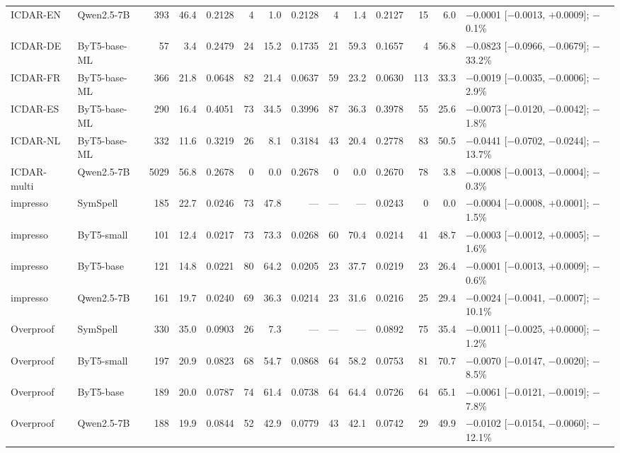 \begin{tabular}{llrrrrrrrrrrrl}
ICDAR-EN & Qwen2.5-7B & 393 & 46.4 & 0.2128 & 4 & 1.0 & 0.2128 & 4 & 1.4 & 0.2127 & 15 & 6.0 & $-$0.0001 [$-$0.0013, $+$0.0009]; $-$0.1\% \\
ICDAR-DE & ByT5-base-ML & 57 & 3.4 & 0.2479 & 24 & 15.2 & 0.1735 & 21 & 59.3 & 0.1657 & 4 & 56.8 & $-$0.0823 [$-$0.0966, $-$0.0679]; $-$33.2\% \\
ICDAR-FR & ByT5-base-ML & 366 & 21.8 & 0.0648 & 82 & 21.4 & 0.0637 & 59 & 23.2 & 0.0630 & 113 & 33.3 & $-$0.0019 [$-$0.0035, $-$0.0006]; $-$2.9\% \\
ICDAR-ES & ByT5-base-ML & 290 & 16.4 & 0.4051 & 73 & 34.5 & 0.3996 & 87 & 36.3 & 0.3978 & 55 & 25.6 & $-$0.0073 [$-$0.0120, $-$0.0042]; $-$1.8\% \\
ICDAR-NL & ByT5-base-ML & 332 & 11.6 & 0.3219 & 26 & 8.1 & 0.3184 & 43 & 20.4 & 0.2778 & 83 & 50.5 & $-$0.0441 [$-$0.0702, $-$0.0244]; $-$13.7\% \\
ICDAR-multi & Qwen2.5-7B & 5029 & 56.8 & 0.2678 & 0 & 0.0 & 0.2678 & 0 & 0.0 & 0.2670 & 78 & 3.8 & $-$0.0008 [$-$0.0013, $-$0.0004]; $-$0.3\% \\
impresso & SymSpell & 185 & 22.7 & 0.0246 & 73 & 47.8 & — & — & — & 0.0243 & 0 & 0.0 & $-$0.0004 [$-$0.0008, $+$0.0001]; $-$1.5\% \\
impresso & ByT5-small & 101 & 12.4 & 0.0217 & 73 & 73.3 & 0.0268 & 60 & 70.4 & 0.0214 & 41 & 48.7 & $-$0.0003 [$-$0.0012, $+$0.0005]; $-$1.6\% \\
impresso & ByT5-base & 121 & 14.8 & 0.0221 & 80 & 64.2 & 0.0205 & 23 & 37.7 & 0.0219 & 23 & 26.4 & $-$0.0001 [$-$0.0013, $+$0.0009]; $-$0.6\% \\
impresso & Qwen2.5-7B & 161 & 19.7 & 0.0240 & 69 & 36.3 & 0.0214 & 23 & 31.6 & 0.0216 & 25 & 29.4 & $-$0.0024 [$-$0.0041, $-$0.0007]; $-$10.1\% \\
Overproof & SymSpell & 330 & 35.0 & 0.0903 & 26 & 7.3 & — & — & — & 0.0892 & 75 & 35.4 & $-$0.0011 [$-$0.0025, $+$0.0000]; $-$1.2\% \\
Overproof & ByT5-small & 197 & 20.9 & 0.0823 & 68 & 54.7 & 0.0868 & 64 & 58.2 & 0.0753 & 81 & 70.7 & $-$0.0070 [$-$0.0147, $-$0.0020]; $-$8.5\% \\
Overproof & ByT5-base & 189 & 20.0 & 0.0787 & 74 & 61.4 & 0.0738 & 64 & 64.4 & 0.0726 & 64 & 65.1 & $-$0.0061 [$-$0.0121, $-$0.0019]; $-$7.8\% \\
Overproof & Qwen2.5-7B & 188 & 19.9 & 0.0844 & 52 & 42.9 & 0.0779 & 43 & 42.1 & 0.0742 & 29 & 49.9 & $-$0.0102 [$-$0.0154, $-$0.0060]; $-$12.1\% \\
\bottomrule
\end{tabular}
